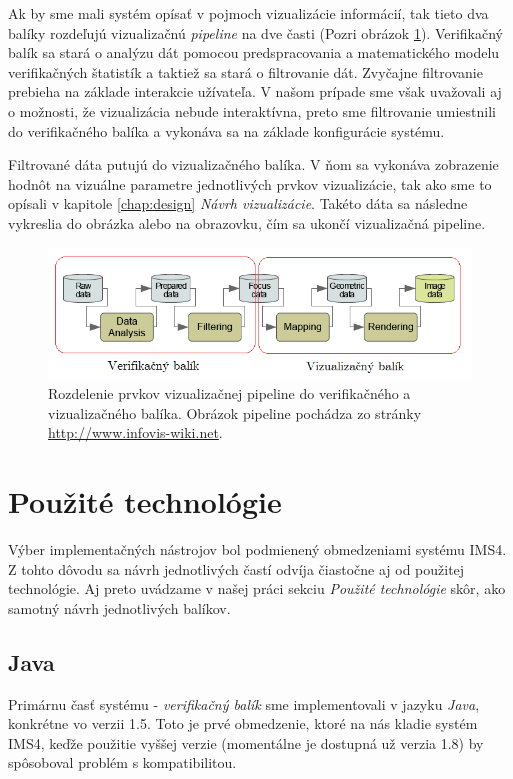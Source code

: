 Ak by sme mali systém opísať v pojmoch vizualizácie informácií, tak tieto dva balíky rozdeľujú vizualizačnú \textit{pipeline} na dve časti (Pozri obrázok \ref{fig:pipeline}). Verifikačný balík sa stará o analýzu dát pomocou predspracovania a matematického modelu verifikačných štatistík a taktiež sa stará o filtrovanie dát. Zvyčajne filtrovanie prebieha na základe interakcie užívateľa. V našom prípade sme však uvažovali aj o možnosti, že vizualizácia nebude interaktívna, preto sme filtrovanie umiestnili do verifikačného balíka a vykonáva sa na základe konfigurácie systému. 

Filtrované dáta putujú do vizualizačného balíka. V ňom sa vykonáva zobrazenie hodnôt na vizuálne parametre jednotlivých prvkov vizualizácie, tak ako sme to opísali v kapitole \ref{chap:design} \textit{Návrh vizualizácie}. Takéto dáta sa následne vykreslia do obrázka alebo na obrazovku, čím sa ukončí vizualizačná pipeline.

\begin{figure}
	\centering
	\includegraphics[width = 6in]{pipeline}
	\caption{Rozdelenie prvkov vizualizačnej pipeline do verifikačného a vizualizačného balíka. Obrázok pipeline pochádza zo stránky \protect\url{http://www.infovis-wiki.net}.}
	\label{fig:pipeline} 
\end{figure}


\section{Použité technológie}
Výber implementačných nástrojov bol podmienený obmedzeniami systému IMS4. Z tohto dôvodu sa návrh jednotlivých častí odvíja čiastočne aj od použitej technológie. Aj preto uvádzame v našej práci sekciu \textit{Použité technológie} skôr, ako samotný návrh jednotlivých balíkov.

\subsection{Java}
Primárnu časť systému - \textit{verifikačný balík} sme implementovali v jazyku \textit{Java}, konkrétne vo verzii 1.5. Toto je prvé obmedzenie, ktoré na nás kladie systém IMS4, keďže použitie vyššej verzie (momentálne je dostupná už verzia 1.8) by spôsoboval problém s kompatibilitou.

